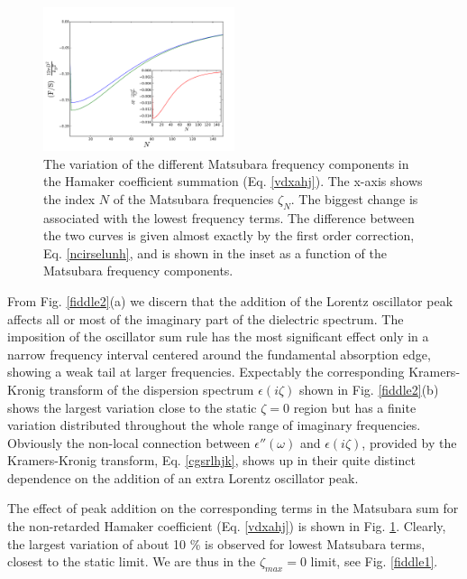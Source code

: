 \documentclass[letterpaper,twocolumn,amsmath,amssymb,floatfix,aps,superscriptaddress]{revtex4}
\begin{document}
\begin{figure}[t!]
\begin{center}
\includegraphics[width=0.5\textwidth]{./130807_plots/fig3_F_dF.pdf} 
\end{center}
\caption{The variation of the different Matsubara frequency components in the Hamaker coefficient summation (Eq. \ref{vdxahj}). The x-axis shows the index $N$ of the Matsubara frequencies $\zeta_N$. The biggest change is associated with the lowest frequency terms. The difference between the two curves is given almost exactly by the first order correction, Eq. \ref{ncirselunh}, and is shown in the inset as a function of the Matsubara frequency components.}
\label{fiddle3}
\end{figure} 

From Fig. \ref{fiddle2}(a) we discern that the addition of the Lorentz oscillator peak affects all or most of the imaginary part of the dielectric spectrum. The imposition of the oscillator sum rule has the most significant effect only in a narrow frequency interval centered around the fundamental absorption edge, showing a weak tail at larger frequencies.  Expectably the corresponding Kramers-Kronig transform of the dispersion spectrum $\epsilon(i \zeta)$ shown in Fig. \ref{fiddle2}(b) shows the largest  variation close to the static $\zeta = 0$ region but has a finite variation distributed throughout the whole range of imaginary frequencies. Obviously the non-local connection between $\epsilon'' (\omega)$ and $\epsilon(i \zeta)$, provided by the Kramers-Kronig transform, Eq. \ref{cgsrlhjk}, shows up in their quite distinct dependence on the addition of an extra Lorentz oscillator peak. 

The effect of peak addition on the corresponding terms in the Matsubara sum for the non-retarded Hamaker coefficient (Eq. \ref{vdxahj}) is shown in Fig. \ref{fiddle3}.  Clearly, the largest variation of about 10 \% is observed for lowest Matsubara terms, closest to the static limit. We are thus in the $\zeta_{max} = 0$ limit, see Fig. \ref{fiddle1}.  
\end{document}
